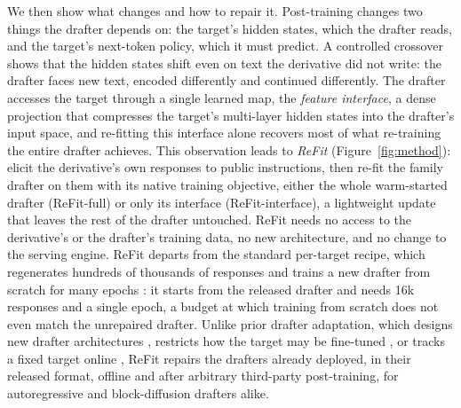 \documentclass[11pt]{article}
\newcommand{\refit}{ReFit}
\newcommand{\refitI}{ReFit-interface}
\newcommand{\refitF}{ReFit-full}
\begin{document}
We then show what changes and how to repair it.
Post-training changes two things the drafter depends on: the target's hidden states, which the drafter reads, and the target's next-token policy, which it must predict.
A controlled crossover shows that the hidden states shift even on text the derivative did not write: the drafter faces new text, encoded differently and continued differently.
The drafter accesses the target through a single learned map, the \emph{feature interface}, a dense projection that compresses the target's multi-layer hidden states into the drafter's input space, and re-fitting this interface alone recovers most of what re-training the entire drafter achieves.
This observation leads to \emph{\refit{}} (Figure~\ref{fig:method}): elicit the derivative's own responses to public instructions, then re-fit the family drafter on them with its native training objective, either the whole warm-started drafter (\refitF{}) or only its interface (\refitI{}), a lightweight update that leaves the rest of the drafter untouched.
\refit{} needs no access to the derivative's or the drafter's training data, no new architecture, and no change to the serving engine.
\refit{} departs from the standard per-target recipe, which regenerates hundreds of thousands of responses and trains a new drafter from scratch for many epochs \citep{li2026specforge,redhat2025speculators}: it starts from the released drafter and needs 16k responses and a single epoch, a budget at which training from scratch does not even match the unrepaired drafter.
Unlike prior drafter adaptation, which designs new drafter architectures \citep{lin2026eda}, restricts how the target may be fine-tuned \citep{li2026flexspec}, or tracks a fixed target online \citep{liu2024online,zhang2026evospec}, \refit{} repairs the drafters already deployed, in their released format, offline and after arbitrary third-party post-training, for autoregressive and block-diffusion drafters alike.
\end{document}
